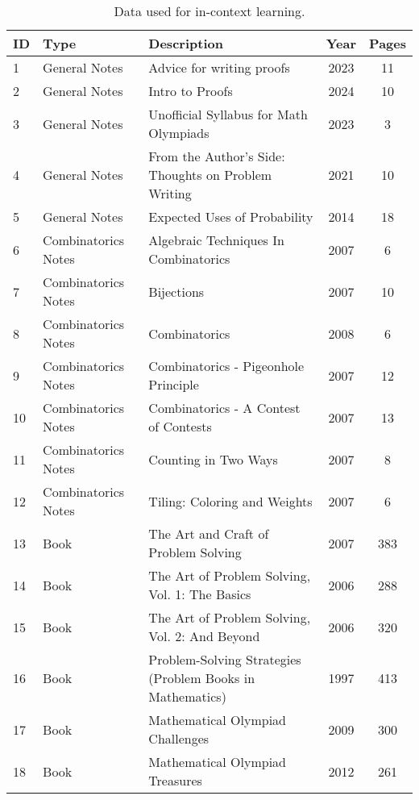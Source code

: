 \begin{table}[htb]
  \centering
  \small
  \caption{Data used for in-context learning.}
\begin{tabular}{lllcc}
    \toprule
{\bf ID} & {\bf Type} & {\bf Description} & {\bf Year} & {\bf Pages} \\
    \midrule
1 & General Notes & Advice for writing proofs \cite{chenimo1} & 2023 & 11\\
2 & General Notes & Intro to Proofs \cite{chenimo2} & 2024 & 10\\
3 & General Notes & Unofficial Syllabus for Math Olympiads \cite{chenimo3} & 2023 & 3\\
4 & General Notes & From the Author's Side: Thoughts on Problem Writing \cite{chenimo4} & 2021 & 10\\
5 & General Notes & Expected Uses of Probability \cite{chenimo5} & 2014 & 18\\
    \midrule
6 & Combinatorics Notes & Algebraic Techniques In Combinatorics \cite{zhao2007algebraic} & 2007 & 6\\
7 & Combinatorics Notes & Bijections \cite{zhao2007bijections} & 2007 & 10\\
8 & Combinatorics Notes & Combinatorics \cite{zhao2008comb_fundamental} & 2008 & 6\\
9 & Combinatorics Notes & Combinatorics - Pigeonhole Principle \cite{zhao2007comb_pigeon} & 2007 & 12\\
10 & Combinatorics Notes & Combinatorics - A Contest of Contests \cite{zhao2007comb_advanced} & 2007 & 13\\
11 & Combinatorics Notes & Counting in Two Ways \cite{zhao2007doublecounting} & 2007 & 8\\
12 & Combinatorics Notes & Tiling: Coloring and Weights \cite{zhao2007tiling} & 2007 & 6\\
    \midrule
13 & Book & The Art and Craft of Problem Solving \cite{zeitz2007art} & 2007 & 383\\
14 & Book & The Art of Problem Solving, Vol. 1: The Basics \cite{lehoczky2006art1} & 2006 & 288\\
15 & Book & The Art of Problem Solving, Vol. 2: And Beyond \cite{lehoczky2006art2} & 2006 & 320\\
16 & Book & Problem-Solving Strategies (Problem Books in Mathematics) \cite{engel1997problem} & 1997 & 413 \\
17 & Book & Mathematical Olympiad Challenges \cite{andreescu2009mochallenges} & 2009 & 300\\
18 & Book & Mathematical Olympiad Treasures \cite{andreescu2012motreasures} & 2012 & 261\\

\end{tabular}
\end{table}
